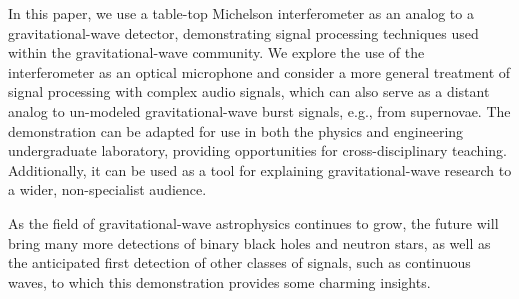 \documentclass[paper-main.tex]{subfiles}
\begin{document}


In this paper, we use a table-top Michelson interferometer as an analog to a gravitational-wave detector, demonstrating signal processing techniques used within the gravitational-wave community.
We explore the use of the interferometer as an optical microphone and consider a more general treatment of signal processing with complex audio signals, which can also serve as a distant analog to un-modeled gravitational-wave burst signals, e.g., from supernovae.
The demonstration can be adapted for use in both the physics and engineering undergraduate laboratory, providing opportunities for cross-disciplinary teaching. 
Additionally, it can be used as a tool for explaining gravitational-wave research to a wider, non-specialist audience. 


\begin{comment}

The demonstration presented has the potential to be adapted for use in the undergraduate laboratory.
It can be used to teach topics of interest to physics and electrical engineering students including interferometer physics; gravitational-wave detection, searches, and analysis; and signal processing with filters and speech enhancement techniques. 
The increased excitement and public interest in the field of gravitational-wave research in recent years mean that this demonstration may also be adapted as a tool for explaining gravitational-wave research to a wider, non-specialist audience. 

\end{comment}

As the field of gravitational-wave astrophysics continues to grow, the future will bring many more detections of binary black holes and neutron stars, as well as the anticipated first detection of other classes of signals, such as continuous waves, to which this demonstration provides some charming insights. 
\end{document}
